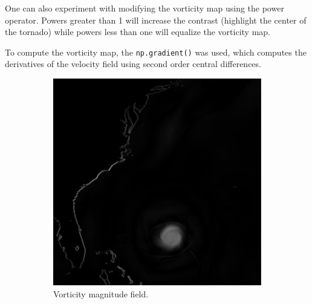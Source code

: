 \documentclass{article}
\begin{document}
One can also experiment with modifying the vorticity map using the power operator. Powers greater than 1 will increase the contrast
(highlight the center of the tornado) while powers less than one will equalize the vorticity map.

To compute the vorticity map, the \verb|np.gradient()| was used, which computes the derivatives of the velocity field
using second order central differences.


\begin{figure}[h!]
    \centering
    \begin{subfigure}{0.32\textwidth}
        \centering
        \includegraphics[width=\textwidth]{vorticity_map.png}
        \caption{Vorticity magnitude field.}
    \end{subfigure}
    \hfill
    \begin{subfigure}{0.32\textwidth}
        \centering

\end{subfigure}
\end{figure}
\end{document}
